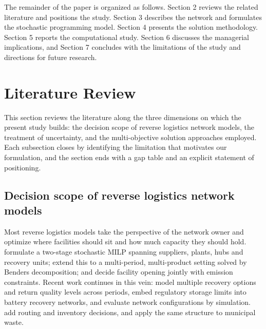 \documentclass[11pt, a4paper]{article}
\begin{document}
The remainder of the paper is organized as follows. Section 2 reviews the related literature and positions the study. Section 3 describes the network and formulates the stochastic programming model. Section 4 presents the solution methodology. Section 5 reports the computational study. Section 6 discusses the managerial implications, and Section 7 concludes with the limitations of the study and directions for future research.

\section{Literature Review}

This section reviews the literature along the three dimensions on which the present study builds: the decision scope of reverse logistics network models, the treatment of uncertainty, and the multi-objective solution approaches employed. Each subsection closes by identifying the limitation that motivates our formulation, and the section ends with a gap table and an explicit statement of positioning.

\subsection{Decision scope of reverse logistics network models}
Most reverse logistics models take the perspective of the network owner and optimize where facilities should sit and how much capacity they should hold. \citet{zeballos2018integrating} formulate a two-stage stochastic MILP spanning suppliers, plants, hubs and recovery units; \citet{mardan2019accelerated} extend this to a multi-period,
multi-product setting solved by Benders decomposition; \citet{Yavari2019} and \citet{Nohkim2019} decide facility opening jointly with emission constraints. Recent work continues in this vein: \citet{tarin2024mixed} model multiple recovery options and return quality levels across periods, \citet{zhao2026embedding} embed regulatory storage limits into battery recovery networks, and \citet{fani2025sustainable} evaluate network configurations by simulation. \citet{Parast2021, poursoltan2021two} add routing and inventory decisions, and \citet{Sadeghi2021} apply the same structure to municipal waste.
\end{document}
